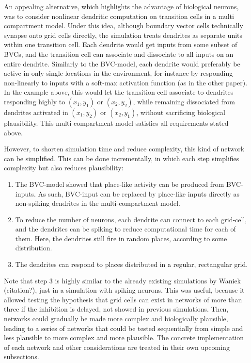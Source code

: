 \documentclass{article}
\begin{document}
    An appealing alternative, which highlights the advantage of biological neurons, was to consider nonlinear dendritic computation on transition cells in a multi compartment model. Under this idea, although boundary vector cells technically synapse onto grid cells directly, the simulation treats dendrites as separate units within one transition cell. Each dendrite would get inputs from some subset of BVCs, and the transition cell can associate and dissociate to all inputs on an entire dendrite. Similarly to the BVC-model, each dendrite would preferably be active in only single locations in the environment, for instance by responding non-linearly to inputs with a soft-max activation function (as in the other paper). In the example above, this would let the transition cell associate to dendrites responding highly to \((x_1, y_1)\) or \((x_2, y_2)\), while remaining dissociated from dendrites activated in \((x_1, y_2)\) or \((x_2, y_1)\), without sacrificing biological plausibility. This multi compartment model satisfies all requirements stated above. 

    However, to shorten simulation time and reduce complexity, this kind of network can be simplified. This can be done incrementally, in which each step simplifies complexity but also reduces plausibility:
    \begin{enumerate}
        \item The BVC-model showed that place-like activity can be produced from BVC-inputs. As such, BVC-input can be replaced by place-like inputs directly as non-spiking dendrites in the multi-compartment model. 
        \item To reduce the number of neurons, each dendrite can connect to each grid-cell, and the dendrites can be spiking to reduce computational time for each of them. Here, the dendrites still fire in random places, according to some distribution.
        \item The dendrites can respond to places distributed in a regular, rectangular grid.
    \end{enumerate}
 
    Note that step 3 is highly similar to the already existing simulations by Waniek (citation?), just in a simulation with spiking neurons. This was useful, because it allowed testing the hypothesis that grid cells can exist in networks of more than three if the inhibition is delayed, not showed in previous simulations. Then, networks could gradually be made more complex and biologically plausible, leading to a series of networks that could be tested sequentially from simple and less plausible to more complex and more plausible. The concrete implementation of each network and other considerations are treated in their own upcoming subsections.
\end{document}

